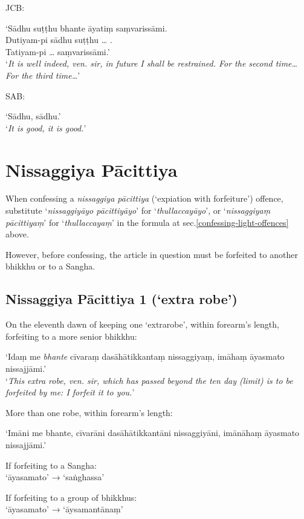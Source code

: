 JCB:

‘Sādhu suṭṭhu bhante āyatiṃ saṃvarissāmi.\\
Dutiyam-pi sādhu suṭṭhu … .\\
Tatiyam-pi … saṃvarissāmi.’\\
‘\emph{It is well indeed, ven. sir, in future I shall be restrained. For the second time… For the third time…}’

SAB:

‘Sādhu, sādhu.’\\
‘\emph{It is good, it is good.}’


\section{Nissaggiya Pācittiya}

When confessing a \emph{nissaggiya pācittiya} (‘expiation with forfeiture’)
offence, substitute ‘\emph{nissaggiyāyo pācittiyāyo}’ for
‘\emph{thullaccayāyo}’, or ‘\emph{nissaggiyaṃ pācittiyaṃ}’ for
‘\emph{thullaccayaṃ}’ in the formula at sec.\ref{confessing-light-offences}
above.

However, before confessing, the article in question must be forfeited to another
bhikkhu or to a Sangha.


\subsection{Nissaggiya Pācittiya 1 (‘extra robe’)}
\label{np-1-extra-robe}

On the eleventh dawn of keeping one ‘extrarobe’, within forearm's length,
forfeiting to a more senior bhikkhu:

‘Idaṃ me \emph{bhante} cīvaraṃ dasāhātikkantaṃ nissaggiyaṃ, imāhaṃ āyasmato nissajjāmi.’\\
‘\emph{This extra robe, ven. sir, which has passed beyond the ten day (limit) is
  to be forfeited by me: I forfeit it to you.}’

More than one robe, within forearm's length:

‘Imāni me bhante, cīvarāni dasāhātikkantāni nissaggiyāni, imānāhaṃ āyasmato nissajjāmi.’

If forfeiting to a Sangha:\\
‘āyasamato’ → ‘saṅghassa’ 

If forfeiting to a group of bhikkhus:\\
‘āyasamato’ → ‘āysamantānaṃ’

